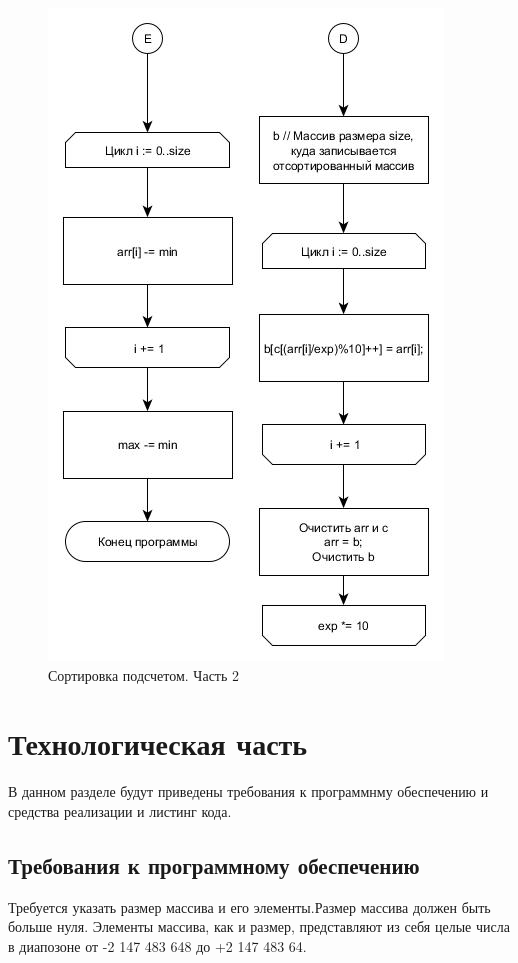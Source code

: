 \documentclass[a4paper, 14pt]{article}
\begin{document}
\begin{figure}[pt!]
\centering
\center\includegraphics[scale=0.7]{radix_3.jpg}
\caption{Сортировка подсчетом. Часть 2}
\label{ris:radix_2}
\end{figure}
	\newpage
	\section{Технологическая часть}
	\hspace{1cm}В данном разделе будут приведены требования к программнму обеспечению и средства реализации и листинг кода.
	\subsection{Требования к программному обеспечению}
	 \hspace{1cm} Требуется указать размер массива и его элементы.Размер массива должен быть больше нуля. Элементы массива, как и размер, представляют из себя целые числа в диапозоне от -2 147 483 648 до +2 147 483 64.
\end{document}
